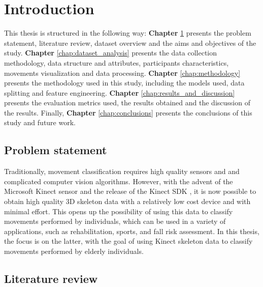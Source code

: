 %
%
\hypersetup{colorlinks=true, linkcolor=red}
\chapter{Introduction} \label{chap:introduction}

    This thesis is structured in the following way: \textbf{Chapter} \ref{chap:introduction} presents the problem statement, literature review, dataset overview and the aims and objectives of the study. \textbf{Chapter} \ref{chap:dataset_analysis} presents the data collection methodology, data structure and attributes, participants characteristics, movements visualization and data processing. \textbf{Chapter} \ref{chap:methodology} presents the methodology used in this study, including the models used, data splitting and feature engineering. \textbf{Chapter} \ref{chap:results_and_discussion} presents the evaluation metrics used, the results obtained and the discussion of the results. Finally, \textbf{Chapter} \ref{chap:conclusions} presents the conclusions of this study and future work.

   \section{Problem statement}

      Traditionally, movement classification requires high quality sensors and and complicated computer vision algorithms. However, with the advent of the Microsoft Kinect sensor and the release of the Kinect SDK \cite{jana_kinect_2012}, it is now possible to obtain high quality 3D skeleton data with a relatively low cost device and with minimal effort. This opens up the possibility of using this data to classify movements performed by individuals, which can be used in a variety of applications, such as rehabilitation, sports, and fall risk assessment. In this thesis, the focus is on the latter, with the goal of using Kinect skeleton data to classify movements performed by elderly individuals.
  
   \section{Literature review}
      

